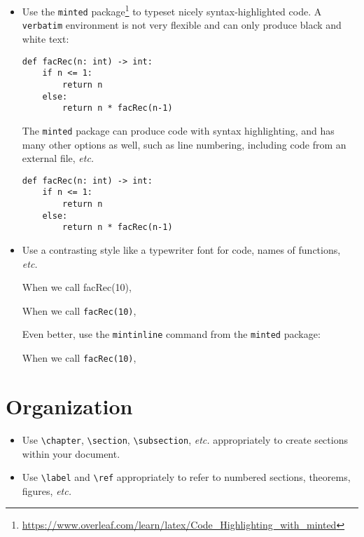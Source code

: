 \documentclass{article}
\begin{document}
\begin{itemize}
\item Use the \texttt{minted}
  package\footnote{\url{https://www.overleaf.com/learn/latex/Code_Highlighting_with_minted}}
  to typeset nicely syntax-highlighted code.  A \verb|verbatim|
  environment is not very flexible and can only produce black and
  white text:
  \begin{bad}
\begin{verbatim}
def facRec(n: int) -> int:
    if n <= 1:
        return n
    else:
        return n * facRec(n-1)
\end{verbatim}
  \end{bad}
The \texttt{minted} package can produce code with syntax highlighting,
and has many other options as well, such as line numbering, including
code from an external file, \emph{etc.}
  \begin{good}
\begin{verbatim}
def facRec(n: int) -> int:
    if n <= 1:
        return n
    else:
        return n * facRec(n-1)
\end{verbatim}
  \end{good}
\item Use a contrasting style like a typewriter font for code, names
  of functions, \emph{etc.}
  \begin{bad}When we call facRec(10),\end{bad}
  \begin{good}When we call \texttt{facRec(10)},\end{good}
  Even better, use the \verb|mintinline| command from the
  \texttt{minted} package:
  \begin{good}When we call \texttt{facRec(10)},\end{good}
\end{itemize}

\section*{Organization}

\begin{itemize}
\item Use \verb|\chapter|, \verb|\section|, \verb|\subsection|,
  \emph{etc.} appropriately to create sections within your document.
\item Use \verb|\label| and \verb|\ref| appropriately to refer to
  numbered sections, theorems, figures, \emph{etc.}
\end{itemize}
\end{document}
